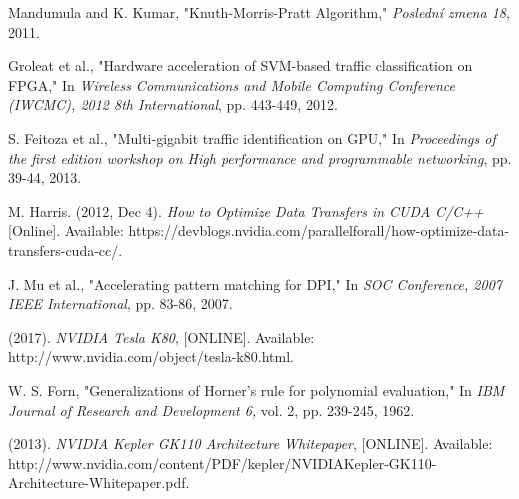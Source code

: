 \begin{thebibliography}{10}
 Mandumula and K. Kumar, "Knuth-Morris-Pratt Algorithm," \textit{Poslední zmena 18}, 2011.

 Groleat et al., "Hardware acceleration of SVM-based traffic classification on FPGA," In \textit{Wireless Communications and Mobile Computing Conference (IWCMC), 2012 8th International}, pp. 443-449, 2012.

 S. Feitoza et al., "Multi-gigabit traffic identification on GPU," In \textit{Proceedings of the first edition workshop on High performance and programmable networking}, pp. 39-44, 2013.

 M. Harris. (2012, Dec 4). \textit{How to Optimize Data Transfers in CUDA C/C++} [Online]. Available: https://devblogs.nvidia.com/parallelforall/how-optimize-data-transfers-cuda-cc/.

 J. Mu et al., "Accelerating pattern matching for DPI," In \textit{SOC Conference, 2007 IEEE International}, pp. 83-86, 2007.

 (2017). \textit{NVIDIA Tesla K80}, [ONLINE]. Available: http://www.nvidia.com/object/tesla-k80.html.

 W. S. Forn, "Generalizations of Horner's rule for polynomial evaluation," In \textit{IBM Journal of Research and Development 6,} vol. 2, pp. 239-245, 1962.

(2013). \textit{NVIDIA Kepler GK110 Architecture Whitepaper}, [ONLINE]. Available: http://www.nvidia.com/content/PDF/kepler/NVIDIAKepler-GK110-Architecture-Whitepaper.pdf.


\end{thebibliography}
